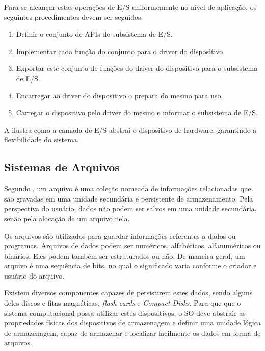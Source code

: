 Para se alcançar estas operações de E/S uniformemente no nível de aplicação, os seguintes procedimentos devem ser seguidos:

\begin{enumerate}
	\item Definir o conjunto de APIs do subsistema de E/S.
	\item Implementar cada função do conjunto para o driver do dispositivo.
	\item Exportar este conjunto de funções do driver do dispositivo para o subsistema de E/S.
	\item Encarregar ao driver do dispositivo o prepara do mesmo para uso.
	\item Carregar o dispositivo pelo driver do mesmo e informar o subsistema de E/S.
\end{enumerate}

A  ilustra como a camada de E/S abstraí o dispositivo de hardware, garantindo a flexibilidade do sistema.


\subsection{Sistemas de Arquivos}

Segundo , um arquivo é uma coleção nomeada de informações relacionadas que são gravadas em uma unidade secundária e persistente de armazenamento. Pela perspectiva do usuário, dados não podem ser salvos em uma unidade secundária, senão pela alocação de um arquivo nela.

Os arquivos são utilizados para guardar informações referentes a dados ou programas. Arquivos de dados podem ser numéricos, alfabéticos, alfanuméricos ou binários. Eles podem também ser estruturados ou não. De maneira geral, um arquivo é uma sequência de bits, no qual o significado varia conforme o criador e usuário do arquivo.

Existem diversos componentes capazes de persistirem estes dados, sendo alguns deles discos e fitas magnéticas, \emph{flash cards} e \emph{Compact Disks}. Para que que o sistema computacional possa utilizar estes dispositivos, o SO deve abstrair as propriedades físicas dos dispositivos de armazenagem e definir uma unidade lógica de armazenagem, capaz de armazenar e localizar facilmente os dados em forma de arquivos.

